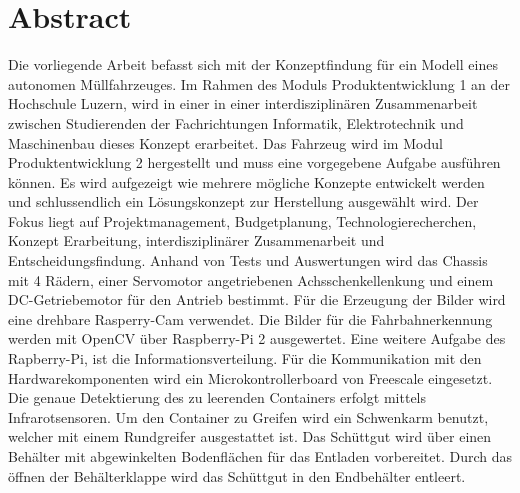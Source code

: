 \section{Abstract}
Die vorliegende Arbeit befasst sich mit der Konzeptfindung für ein Modell eines autonomen Müllfahrzeuges. Im Rahmen des Moduls Produktentwicklung 1 an der Hochschule Luzern, wird in einer in einer interdisziplinären Zusammenarbeit zwischen Studierenden der Fachrichtungen Informatik, Elektrotechnik und Maschinenbau dieses Konzept erarbeitet. Das Fahrzeug wird im Modul Produktentwicklung 2 hergestellt und muss eine vorgegebene Aufgabe ausführen können. Es wird aufgezeigt wie mehrere mögliche Konzepte entwickelt werden und schlussendlich ein Lösungskonzept zur Herstellung ausgewählt wird. Der Fokus liegt auf Projektmanagement, Budgetplanung, Technologierecherchen, Konzept Erarbeitung, interdisziplinärer Zusammenarbeit und Entscheidungsfindung. Anhand von Tests und Auswertungen wird das Chassis mit 4 Rädern, einer Servomotor angetriebenen Achsschenkellenkung und einem DC-Getriebemotor für den Antrieb bestimmt. Für die Erzeugung der Bilder wird eine drehbare Rasperry-Cam verwendet. Die Bilder für die Fahrbahnerkennung werden mit OpenCV über Raspberry-Pi 2 ausgewertet. Eine weitere Aufgabe des Rapberry-Pi, ist die Informationsverteilung. Für die Kommunikation mit den Hardwarekomponenten wird ein Microkontrollerboard von Freescale eingesetzt. Die genaue Detektierung des zu leerenden Containers erfolgt mittels Infrarotsensoren. Um den Container zu Greifen wird ein Schwenkarm benutzt, welcher mit einem Rundgreifer ausgestattet ist. Das Schüttgut wird über einen Behälter mit abgewinkelten Bodenflächen für das Entladen vorbereitet. Durch das öffnen der Behälterklappe wird das Schüttgut in den Endbehälter entleert.
\clearpage
